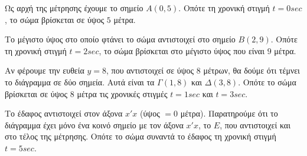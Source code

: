 
\begin{alist}
\item Ως αρχή της μέτρησης έχουμε το σημείο $A(0,5)$. Οπότε τη χρονική στιγμή $t = 0 sec$, το σώμα βρίσκεται σε ύψος $5$ μέτρα.

\item Το μέγιστο ύψος στο οποίο φτάνει το σώμα αντιστοιχεί στο σημείο $B(2,9)$. Οπότε τη χρονική στιγμή $t = 2 sec$, το σώμα βρίσκεται στο μέγιστο ύψος που είναι $9$ μέτρα.

\item Αν φέρουμε την ευθεία $y = 8$, που αντιστοιχεί σε ύψος $8$ μέτρων, θα δούμε ότι τέμνει το διάγραμμα σε δύο σημεία. Αυτά είναι τα $\Gamma(1,8)$ και $\Delta(3,8)$. Οπότε το σώμα βρίσκεται σε ύψος $8$ μέτρα τις χρονικές στιγμές $t = 1 sec$ και $t = 3 sec$.

\item Το έδαφος αντιστοιχεί στον άξονα $x'x$ (ύψος $= 0$ μέτρα). Παρατηρούμε ότι το διάγραμμα έχει μόνο ένα κοινό σημείο με τον άξονα $x'x$, το $E$, που αντιστοιχεί και στο τέλος της μέτρησης. Οπότε το σώμα συναντά το έδαφος τη χρονική στιγμή $t = 5 sec$.
\end{alist}

